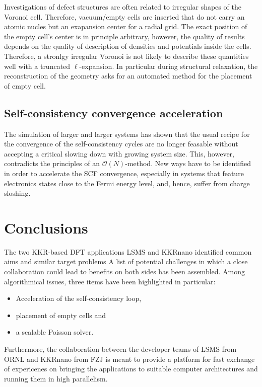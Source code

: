 \documentclass{llncs}
\def\KKRnano{{KKRnano}}
\def\LSMS{{LSMS}}
\begin{document}
Investigations of defect structures are often related to irregular
shapes of the Voronoi cell. Therefore, vacuum/empty cells are inserted that do not carry an atomic nucles
but an exapansion center for a radial grid.
The exact position of the empty cell's center is in principle arbitrary, however, the quality of results
depends on the quality of description of densities and potentials inside the cells. Therefore,
a stronlgy irregular Voronoi is not likely to describe these quantities well with a truncated $\ell$-expansion.
In particular during structural relaxation, the reconstruction of the geometry
asks for an automated method for the placement of empty cell.



\subsection{Self-consistency convergence acceleration} %

The simulation of larger and larger systems has shown that the usual recipe for the
convergence of the self-consistency cycles are no longer feasable without accepting a critical
slowing down with growing system size. 
This, however, contradicts the principles of an $\mathcal O(N)$-method.
New ways have to be identified in order to accelerate the SCF convergence, especially in systems
that feature electronics states close to the Fermi energy level, and, hence, suffer from charge sloshing.


\section{Conclusions}\label{section:summary}

The two KKR-based DFT applications \LSMS{} and \KKRnano{} identified common aims and similar target problems
A list of potential challenges in which a close collaboration could lead to benefits on both sides has been assembled. 
Among algorithmical issues, three items have been highlighted in particular: 
\begin{itemize}
 \item Acceleration of the self-consistency loop,
 \item placement of empty cells and
 \item a scalable Poisson solver.
\end{itemize}
Furthermore, the collaboration between the developer teams of 
\LSMS{} from ORNL 
and
\KKRnano{} from FZJ
is meant to provide a platform for fast exchange of expericenes on
bringing the applications to suitable computer architectures and running them in high parallelism.
\end{document}
